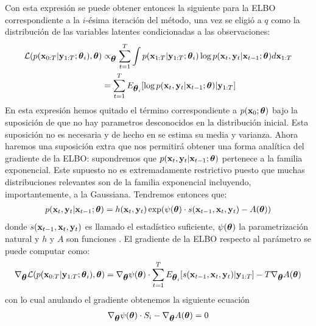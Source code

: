 Con esta expresión se puede obtener entonces la siguiente para la ELBO correspondiente a la $i$-ésima iteración del método, una vez se eligió a $q$ como la distribución de las variables latentes condicionadas a las observaciones:
\begin{align}
    \mathcal{L}(p(\mathbf{x}_{0:T} | \mathbf{y}_{1:T} ; \mbox{\boldmath$ \theta $}_i), \mbox{\boldmath$ \theta $}) &\propto_{\mbox{\boldmath$ \theta $}} \sum_{t=1}^T \int p(\mathbf{x}_{1:T} | \mathbf{y}_{1:T} ; \mbox{\boldmath$ \theta $}_i) \log p(\mathbf{x}_t, \mathbf{y}_t | \mathbf{x}_{t-1} ; \mbox{\boldmath$ \theta $}) d\mathbf{x}_{1:T} \\
    &= \sum_{t=1}^T E_{\mbox{\boldmath$ \theta $}_i} [\log p(\mathbf{x}_t, \mathbf{y}_t | \mathbf{x}_{t-1} ; \mbox{\boldmath$ \theta $}) | \mathbf{y}_{1:T}]
\end{align}
En esta expresión hemos quitado el término correspondiente a $p(\mathbf{x}_0 ; \mbox{\boldmath$ \theta $})$ bajo la suposición de que no hay parametros desconocidos en la distribución inicial. Esta suposición no es necesaria y de hecho en \cite{Dreano2017} se estima su media y varianza. Ahora haremos una suposición extra que nos permitirá obtener una forma analítica del gradiente de la ELBO: supondremos que $p(\mathbf{x}_t, \mathbf{y}_t | \mathbf{x}_{t-1} ; \mbox{\boldmath$ \theta $})$ pertenece a la familia exponencial. Este supuesto no es extremadamente restrictivo puesto que muchas distribuciones relevantes son de la familia exponencial incluyendo, importantemente, a la Gaussiana. Tendremos entonces que:
\begin{align*}
    p(\mathbf{x}_t, \mathbf{y}_t | \mathbf{x}_{t-1} ; \mbox{\boldmath$ \theta $}) = h(\mathbf{x}_t, \mathbf{y}_t) \exp(\psi(\mbox{\boldmath$ \theta $})\cdot s(\mathbf{x}_{t-1}, \mathbf{x}_t, \mathbf{y}_t) - A(\mbox{\boldmath$ \theta $}))
\end{align*}
donde $s(\mathbf{x}_{t-1}, \mathbf{x}_t, \mathbf{y}_t)$ es llamado el estadístico suficiente, $\psi(\mbox{\boldmath$ \theta $})$ la parametrización natural y $h$ y $A$ son funciones \citep{Wasserman2004}. El gradiente de la ELBO respecto al parámetro se puede computar como:
\begin{align}
    \nabla_{\mbox{\boldmath$ \theta $}} \mathcal{L}(p(\mathbf{x}_{0:T} | \mathbf{y}_{1:T} ; \mbox{\boldmath$ \theta $}_i), \mbox{\boldmath$ \theta $}) = \nabla_{\mbox{\boldmath$ \theta $}} \psi(\mbox{\boldmath$ \theta $}) \cdot \sum_{t=1}^T E_{\mbox{\boldmath$ \theta $}_i} [s(\mathbf{x}_{t-1}, \mathbf{x}_t, \mathbf{y}_t) | \mathbf{y}_{1:T}] - T\nabla_{\mbox{\boldmath$ \theta $}}A(\mbox{\boldmath$ \theta $})
\end{align}
con lo cual anulando el gradiente obtenemos la siguiente ecuación
\begin{align} \label{eq:null_elbo_grad}
    \nabla_{\mbox{\boldmath$ \theta $}} \psi(\mbox{\boldmath$ \theta $}) \cdot S_i - \nabla_{\mbox{\boldmath$ \theta $}}A(\mbox{\boldmath$ \theta $}) = 0
\end{align}
